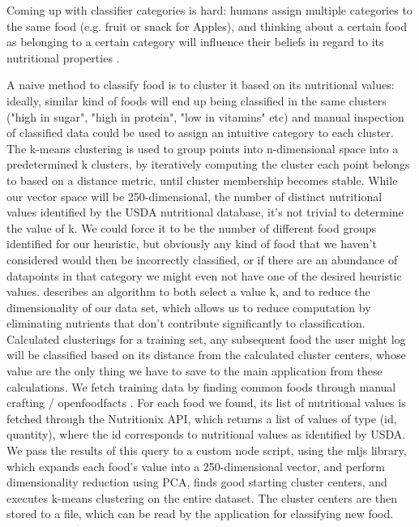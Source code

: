 \documentclass{article}
\begin{document}
Coming up with classifier categories is hard: humans assign multiple categories to the same food (e.g. fruit or snack for Apples), and thinking about a certain food as belonging to a certain category will influence their beliefs in regard to its nutritional properties \cite{Hayes2011}.


A naive method to classify food is to cluster it based on its nutritional values: ideally, similar kind of foods will end up being classified in the same clusters ("high in sugar", "high in protein", "low in vitamins" etc) and manual inspection of classified data could be used to assign an intuitive category to each cluster.
The k-means clustering is used to group points into n-dimensional space into a predetermined k clusters, by iteratively computing the cluster each point belongs to based on a distance metric, until cluster membership becomes stable. While our vector space will be 250-dimensional, the number of distinct nutritional values identified by the USDA nutritional database, it's not trivial to determine the value of k. We could force it to be the number of different food groups identified for our heuristic, but obviously any kind of food that we haven't considered would then be incorrectly classified, or if there are an abundance of datapoints in that category we might even not have one of the desired heuristic values. \cite{Napoleon, 2011} describes an algorithm to both select a value k, and to reduce the dimensionality of our data set, which allows us to reduce computation by eliminating nutrients that don't contribute significantly to classification.
Calculated clusterings for a training set, any subsequent food the user might log will be classified based on its distance from the calculated cluster centers, whose value are the only thing we have to save to the main application from these calculations.
We fetch training data by finding common foods through { manual crafting / openfoodfacts }. For each food we found, its list of nutritional values is fetched through the Nutritionix API, which returns a list of values of type (id, quantity), where the id corresponds to nutritional values as identified by USDA. We pass the results of this query to a custom node script, using the mljs library, which expands each food's value into a 250-dimensional vector, and perform dimensionality reduction using PCA, finds good starting cluster centers, and executes k-means clustering on the entire dataset. The cluster centers are then stored to a file, which can be read by the application for classifying new food.
\end{document}
